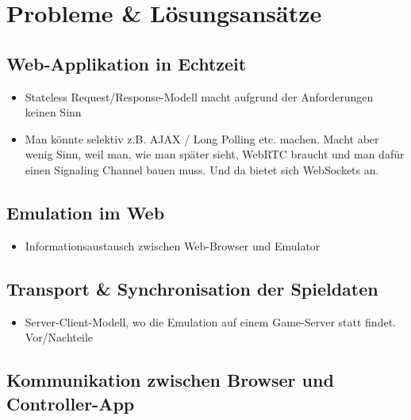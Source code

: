 \chapter{Probleme \&
Lösungsansätze}\label{probleme-luxf6sungsansuxe4tze}

\blindtext[1]

\section{Web-Applikation in Echtzeit}\label{web-applikation-in-echtzeit}

\begin{itemize}
\tightlist
\item
  Stateless Request/Response-Modell macht aufgrund der Anforderungen
  keinen Sinn
\item
  Man könnte selektiv z.B. AJAX / Long Polling etc. machen. Macht aber
  wenig Sinn, weil man, wie man später sieht, WebRTC braucht und man
  dafür einen Signaling Channel bauen muss. Und da bietet sich
  WebSockets an.
\end{itemize}

\section{Emulation im Web}\label{emulation-im-web}

\begin{itemize}
\tightlist
\item
  Informationsaustausch zwischen Web-Browser und Emulator
\end{itemize}

\section{Transport \& Synchronisation der
Spieldaten}\label{transport-synchronisation-der-spieldaten}

\begin{itemize}
\tightlist
\item
  Server-Client-Modell, wo die Emulation auf einem Game-Server statt
  findet. Vor/Nachteile
\end{itemize}

\section{Kommunikation zwischen Browser und
Controller-App}\label{kommunikation-zwischen-browser-und-controller-app}

